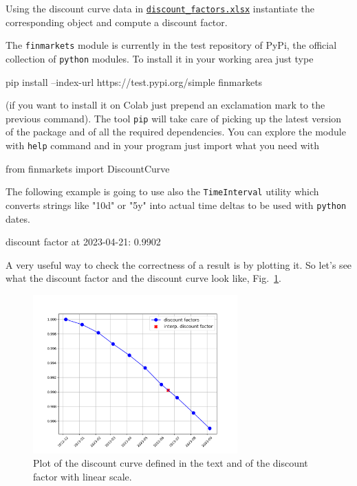 
Using the discount curve data in \href{https://github.com/matteosan1/finance_course/raw/master/input_files/discount_factors_2022-10-05.xlsx}{\texttt{discount\_factors.xlsx}} instantiate the corresponding object and compute a discount factor.

\begin{finmarkets}
The \texttt{finmarkets} module is currently in the test repository of PyPi, the official collection of \texttt{python} modules. 
To install it in your working area just type 

\begin{ioutput}
pip install --index-url https://test.pypi.org/simple finmarkets
\end{ioutput}

(if you want to install it on Colab just prepend an exclamation mark to the previous command). The tool \texttt{pip} will take care of picking up the latest version of the package and of all the required dependencies. You can explore the module with \texttt{help} command and in your program just import what you need with

\begin{ipythonnon}
from finmarkets import DiscountCurve
\end{ipythonnon}
\end{finmarkets}

The following example is going to use also the \texttt{TimeInterval} utility which converts strings like "10d" or "5y" into actual time deltas to be used with \texttt{python} dates.


\begin{ioutput}
discount factor at 2023-04-21: 0.9902
\end{ioutput}

A very useful way to check the correctness of a result is by plotting it. So let's see what the discount factor and the discount curve look like, Fig.~\ref{fig:linear_discount_curve}.

\begin{figure}[htb]
	\centering
	\includegraphics[width=0.7\textwidth]{figures/linear_discount_curve}
	\caption{Plot of the discount curve defined in the text and of the discount factor with linear scale.}
	\label{fig:linear_discount_curve}
\end{figure}

